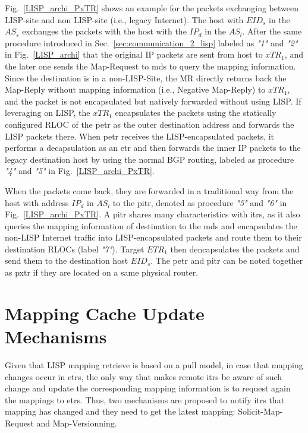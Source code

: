 Fig.~\ref{LISP_archi_PxTR} shows an example for the packets exchanging between LISP-site and non LISP-site (i.e., legacy Internet). The host with $EID_s$ in the $AS_s$ exchanges the packets with the host with the $IP_d$ in the $AS_l$. After the same procedure introduced in Sec.~\ref{sec:communication_2_lisp} labeled as \emph{"1"} and \emph{"2"} in Fig.~\ref{LISP_archi} that the original IP packets are sent from host to $xTR_1$, and the later one sends the Map-Request to \acrshort{mds} to query the mapping information. Since the destination is in a non-LISP-Site, the MR directly returns back the Map-Reply without mapping information (i.e., Negative Map-Reply) to $xTR_1$, and the packet is not encapsulated but natively forwarded without using LISP. If leveraging on LISP, the $xTR_1$ encapsulates the packets using the statically configured RLOC of the \acrshort{petr} as the outer destination address and forwards the LISP packets there. When \acrshort{petr} receives the LISP-encapsulated packets, it performs a decapsulation as an \acrshort{etr} and then forwards the inner IP packets to the legacy destination host by using the normal BGP routing, labeled as procedure \emph{"4"} and \emph{"5"} in Fig.~\ref{LISP_archi_PxTR}. 

When the packets come back, they are forwarded in a traditional way from the host with address $IP_d$ in $AS_l$ to the \acrshort{pitr}, denoted as procedure \emph{"5"} and \emph{"6"} in Fig.~\ref{LISP_archi_PxTR}. A \acrshort{pitr} shares many characteristics with \acrshort{itr}s, as it also queries the mapping information of destination to the \acrshort{mds} and encapsulates the non-LISP Internet traffic into LISP-encapsulated packets and route them to their destination RLOCs (label \emph{"7"}). Target $ETR_1$ then dencapsulates the packets and send them to the destination host $EID_s$. The \acrshort{petr} and \acrshort{pitr} can be noted together as \acrshort{pxtr} if they are located on a same physical router.



\section{Mapping Cache Update Mechanisms}
\label{sec:updateMechanisms}
Given that LISP mapping retrieve is based on a pull model, in case that mapping changes occur in \acrshort{etr}s, the only way that makes remote \acrshort{itr}s be aware of such change and update the corresponding mapping information is to request again the mappings to \acrshort{etr}s. Thus, two mechanisms are proposed to notify \acrshort{itr}s that mapping has changed and they need to get the latest mapping: Solicit-Map-Request and Map-Versionning.


